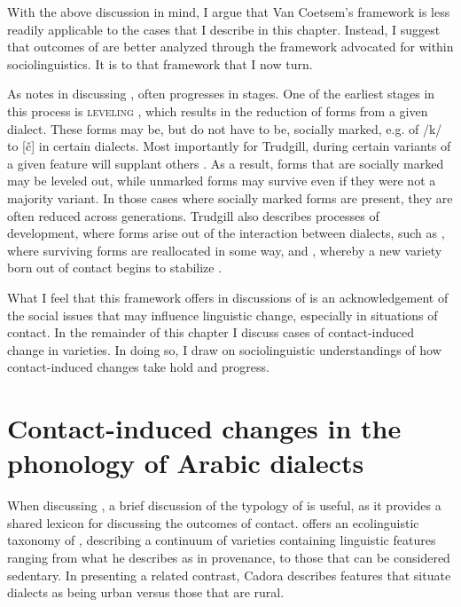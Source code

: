 \documentclass[output=paper]{langsci/langscibook}
\begin{document}
  With the above discussion in mind, I argue that Van Coetsem’s framework is less readily applicable to the cases that I describe in this chapter. Instead, I suggest that outcomes of   are better analyzed through the framework advocated for within sociolinguistics. It is to that framework that I now turn.  

  As \citet{Trudgill2004} notes in discussing  ,  often progresses in stages. One of the earliest stages in this process is \textsc{leveling} \citep[83]{Trudgill2004}, which results in the reduction of forms from a given dialect. These forms may be, but do not have to be, socially marked, e.g.  of /k/ to [č] in certain  dialects. Most importantly for Trudgill, during  certain variants of a given feature will supplant others \citep[85]{Trudgill2004}. As a result, forms that are socially marked may be leveled out, while unmarked forms may survive even if they were not a majority variant. In those cases where socially marked forms are present, they are often reduced across generations. Trudgill also describes processes of  development, where forms arise out of the interaction between dialects, such as , where surviving forms are reallocated in some way, and , whereby a new variety born out of contact begins to stabilize \citep{Trudgill2004}. 

  What I feel that this framework offers in discussions of   is an acknowledgement of the social issues that may influence linguistic change, especially in situations of contact. In the remainder of this chapter I discuss cases of contact-induced change in  varieties. In doing so, I draw on sociolinguistic understandings of how contact-induced changes take hold and progress. 

\section{Contact-induced changes in the phonology of Arabic dialects}

When discussing  , a brief discussion of the typology of  is useful, as it provides a shared lexicon for discussing the outcomes of contact. \citet{Cadora1992} offers an ecolinguistic taxonomy of , describing a continuum of  varieties containing linguistic features ranging from what he describes as  in provenance, to those that can be considered sedentary. In presenting a related contrast, Cadora describes features that situate dialects as being urban versus those that are rural. 
\end{document}
